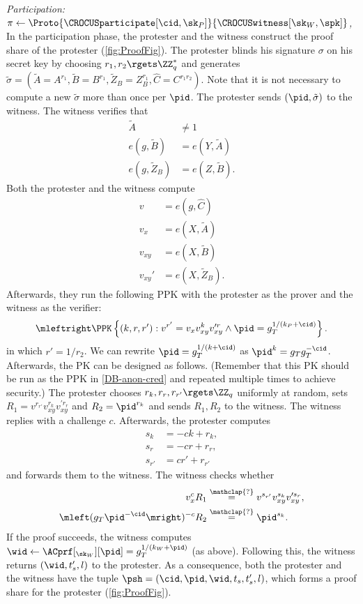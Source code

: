 \emph{Participation: \(\pi\gets
    \Proto{\CROCUSparticipate[\cid, \sk_P]}{\CROCUSwitness[\sk_W, \spk]}\),}
In the participation phase, the protester and the witness construct the proof share of the protester (\cref{fig:ProofFig}).
The protester blinds his signature \(\sigma\) on his secret key by choosing \(r_1, r_2\rgets \ZZ_q^*\) and generates \(
  \tilde\sigma = (\tilde A = A^{r_1},
                  \tilde B = B^{r_1},
                  \tilde Z_B = Z_B^{r_1},
                  \hat C = C^{r_1 r_2}).
\) 
Note that it is not necessary to compute a new \(\tilde\sigma\) more than once per \(\pid\).
The protester sends \((\pid, \tilde\sigma)\) to the witness.
The witness verifies that
\begin{align*}
  \tilde A          &\neq 1 \\
  e(g, \tilde B)    &= e(Y, \tilde A) \\
  e(g, \tilde Z_B)  &= e(Z, \tilde B).
\end{align*}
Both the protester and the witness compute
\begin{align*}
  v &= e(g, \hat C) \\
  v_x &= e(X, \tilde A) \\
  v_{xy} &= e(X, \tilde B) \\
  v_{xy}' &= e(X, \tilde Z_B).
\end{align*}
Afterwards, they run the following \ac{PPK} with the protester as the prover 
and the witness as the verifier:
\begin{multline*}
  \mleftright
  \PPK\left\{(k, r, r') : v^{r'} = v_x v_{xy}^k v_{xy}^{\prime r} \land
    \pid = g_T^{1/(k_P+\cid)} \right\}.
\end{multline*}
in which \(r' = 1/r_2\).
We can rewrite \(\pid = g_T^{1/(k+\cid)}\) as \(\pid^k = g_T g_T^{-\cid}\).
Afterwards, the \ac{PK} can be designed as follows.
(Remember that this \ac{PK} should be run as the \ac{PPK} in 
\cref{DB-anon-cred} and repeated multiple times to achieve security.)
The protester chooses \(r_k, r_r, r_{r'}\rgets \ZZ_q\) uniformly at random, 
sets \(R_1 = v^{r_{r'}} v_{xy}^{r_k} v_{xy}^{\prime r_r}\) and \(R_2 = 
  \pid^{r_k}\) and sends \(R_1, R_2\) to the witness.
The witness replies with a challenge \(c\).
Afterwards, the protester computes
\begin{align*}
  s_k &= -ck + r_k, \\
  s_r &= -cr + r_r, \\
  s_{r'} &= cr' + r_{r'}
\end{align*}
and forwards them to the witness.
The witness checks whether
\begin{align*}
  v_x^c R_1 &\overset{\mathclap{?}}{=} v^{s_{r'}} v_{xy}^{s_k} v_{xy}^{\prime 
    s_r}, \\
  \mleft(g_T \pid^{-\cid}\mright)^{-c} R_2 &\overset{\mathclap{?}}{=} 
  \pid^{s_k}.
\end{align*}
If the proof succeeds, the witness computes \(\wid\gets \ACprf[_{\sk_W}][\pid] 
  = g_T^{1/(k_W+\pid)}\) (as above).
Following this, the witness returns \((\wid, t_s', l)\) to the protester.
As a consequence, both the protester and the witness have the tuple \(\psh = 
  (\cid, \pid, \wid, t_s, t_s', l)\), which forms a proof share for the 
protester (\cref{fig:ProofFig}).



